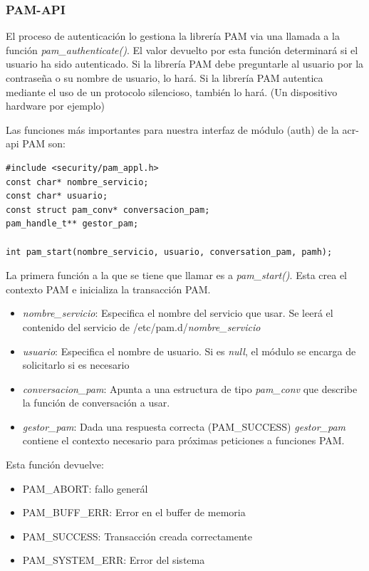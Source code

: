 \documentclass[titlepage, 12pt, a4paper]{article}
\begin{document}
\subsubsection{PAM-API}
El proceso de autenticación lo gestiona la librería PAM via una llamada a la función \textit{pam\_authenticate()}. El valor devuelto por esta función determinará si el usuario ha sido autenticado. Si la librería PAM debe preguntarle al usuario por la contraseña o su nombre de usuario, lo hará. Si la librería PAM autentica mediante el uso de un protocolo silencioso, también lo hará. (Un dispositivo hardware por ejemplo)\cite{linux-pam-application} \par
Las funciones más importantes para nuestra interfaz de módulo (auth) de la \gls{acr-api} PAM son:
\begin{lstlisting}
#include <security/pam_appl.h>
const char* nombre_servicio;
const char* usuario;
const struct pam_conv* conversacion_pam;
pam_handle_t** gestor_pam;

int pam_start(nombre_servicio, usuario, conversation_pam, pamh);
\end{lstlisting}
La primera función a la que se tiene que llamar es a \textit{pam\_start()}. Esta crea el contexto PAM e inicializa la transacción PAM.\par
\begin{itemize}
	\item{\textit{nombre\_servicio}: Especifica el nombre del servicio que usar. Se leerá el contenido del servicio de /etc/pam.d/\textit{nombre\_servicio}}
	\item{\textit{usuario}: Especifica el nombre de usuario. Si es \textit{null}, el módulo se encarga de solicitarlo si es necesario}
	\item{\textit{conversacion\_pam}: Apunta a una estructura de tipo \textit{pam\_conv} que describe la función de conversación a usar.}
	\item{\textit{gestor\_pam}: Dada una respuesta correcta (PAM\_SUCCESS) \textit{gestor\_pam} contiene el contexto necesario para próximas peticiones a funciones PAM.}
\end{itemize} 
Esta función devuelve:
\begin{itemize}
	\item{PAM\_ABORT: fallo generál}
	\item{PAM\_BUFF\_ERR: Error en el buffer de memoria}
	\item{PAM\_SUCCESS: Transacción creada correctamente}
	\item{PAM\_SYSTEM\_ERR: Error del sistema}
\end{itemize} \par
\end{document}
